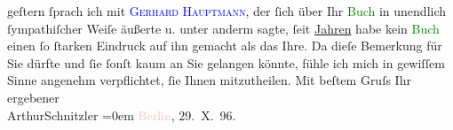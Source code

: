            geſtern ſprach ich mit \textcolor{blue}{\textsc{Gerhard Hauptmann}}{}\ledrightnote{\textcolor{blue}{Gerhart Hauptmann}}, der ſich über Ihr \textcolor{green}{Buch}{} in
               unendlich ſympathiſcher Weiſe äußerte u. unter anderm sagte, ſeit \uline{Jahren} habe kein \textcolor{green}{Buch}{} einen ſo ſtarken Eindruck auf ihn gemacht als das
               Ihre.\pend
           \pstart
           Da dieſe Bemerkung für Sie \label{K_L00611_1v}\label{K_L00611_1h}
               dürfte und ſie ſonſt kaum an Sie {\pb}gelangen
               könnte, fühle ich mich in gewiſſem Sinne angenehm verpflichtet, ſie Ihnen
               mitzutheilen.\pend
           \pstart
           Mit beſtem Gruſs Ihr ergebener{\\[\baselineskip]}\spacefill\mbox{ArthurSchnitzler}\pend
           \leftskip=0em{}\pstart
           \textcolor{pink}{Berlin}{}\ledrightnote{\textcolor{pink}{Berlin}}, 29. X. 96.\pend
           \endnumbering{}  
      